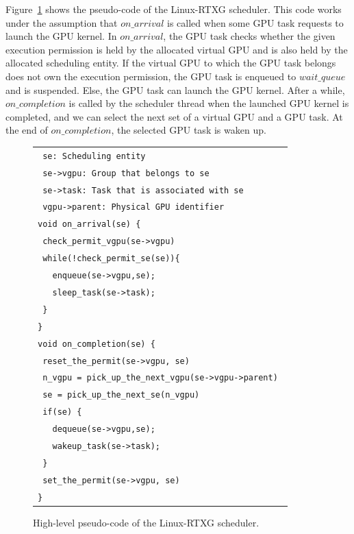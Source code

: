 Figure~\ref{fig:scheduling} shows the pseudo-code of the Linux-RTXG
scheduler.
This code works under the assumption that $on\_arrival$ is called when
some GPU task requests to launch the GPU kernel.
In $on\_arrival$, the GPU task checks whether the given execution
permission is held by the allocated virtual GPU and is also held by the
allocated scheduling entity.
If the virtual GPU to which the GPU task belongs does not own the
execution permission, the GPU task is enqueued to $wait\_queue$ and is
suspended.
Else, the GPU task can launch the GPU kernel.
After a while, $on\_completion$ is called by the scheduler thread when
the launched GPU kernel is completed, and we can select the next set of
a virtual GPU and a GPU task. 
At the end of $on\_completion$, the selected GPU task is waken up.

\begin{figure}[!t]
\begin{center}
\begin{tabular}{l}
\hline
{\scriptsize \verb| se: Scheduling entity |}\\
{\scriptsize \verb| se->vgpu: Group that belongs to se|}\\
{\scriptsize \verb| se->task: Task that is associated with se |}\\
{\scriptsize \verb| vgpu->parent: Physical GPU identifier|}\\
\hline
{\scriptsize \verb|void on_arrival(se) {|}\\
{\scriptsize \verb| check_permit_vgpu(se->vgpu)    |}\\
{\scriptsize \verb| while(!check_permit_se(se)){|}\\
{\scriptsize \verb|   enqueue(se->vgpu,se); |}\\
{\scriptsize \verb|   sleep_task(se->task); |}\\
{\scriptsize \verb| }|}\\
{\scriptsize \verb|}|}\\
{\scriptsize \verb|void on_completion(se) {|}\\
{\scriptsize \verb| reset_the_permit(se->vgpu, se)|}\\
{\scriptsize \verb| n_vgpu = pick_up_the_next_vgpu(se->vgpu->parent) |}\\
{\scriptsize \verb| se = pick_up_the_next_se(n_vgpu)|}\\
{\scriptsize \verb| if(se) {|}\\
{\scriptsize \verb|   dequeue(se->vgpu,se);|}\\
{\scriptsize \verb|   wakeup_task(se->task);|}\\
{\scriptsize \verb| }|}\\
{\scriptsize \verb| set_the_permit(se->vgpu, se)|}\\
{\scriptsize \verb|}|}\\
\hline
\end{tabular}
\caption{High-level pseudo-code of the Linux-RTXG scheduler.}
\label{fig:scheduling}
\end{center}
\end{figure}

